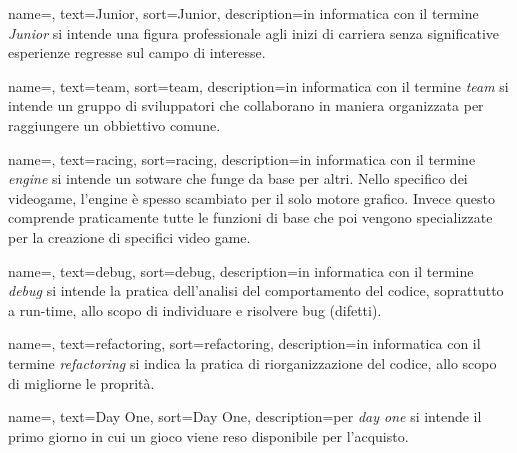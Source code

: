 
\renewcommand{\acronymname}{Acronimi e abbreviazioni}





{
	name=,
	text=Junior,
	sort=Junior,
	description={in informatica con il termine \emph{Junior} si intende una figura professionale agli inizi di carriera senza significative esperienze regresse sul campo di interesse.}
}

{
	name=,
	text=team,
	sort=team,
	description={in informatica con il termine \emph{team} si intende un gruppo di sviluppatori che collaborano in maniera organizzata per raggiungere un obbiettivo comune.}
}

{
	name=,
	text=racing,
	sort=racing,
	description={in informatica con il termine \emph{engine} si intende un sotware che funge da base per altri. Nello specifico dei videogame, l'engine è spesso scambiato per il solo motore grafico. Invece questo comprende praticamente tutte le funzioni di base che poi vengono specializzate per la creazione di specifici video game.}
}

{
	name=,
	text=debug,
	sort=debug,
	description={in informatica con il termine \emph{debug} si intende la pratica dell'analisi del comportamento del codice, soprattutto a run-time, allo scopo di individuare e risolvere bug (difetti).}
}

{
	name=,
	text=refactoring,
	sort=refactoring,
	description={in informatica con il termine \emph{refactoring} si indica la pratica di riorganizzazione del codice, allo scopo di migliorne le proprità.}
}

{
	name=,
	text=Day One,
	sort=Day One,
	description={per \emph{day one} si intende il primo giorno in cui un gioco viene reso disponibile per l'acquisto.}
}


